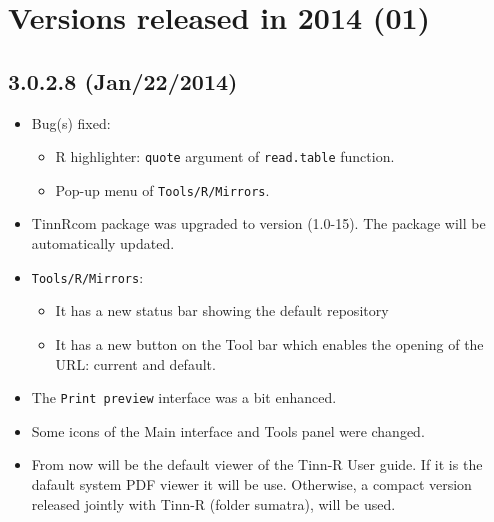 
\section{Versions released in 2014 (01)}
\subsection{3.0.2.8 (Jan/22/2014)}
\begin{itemize}
  \item Bug(s) fixed:
    \begin{itemize}
      \item R highlighter: \texttt{quote} argument of \texttt{read.table} function.
      \item Pop-up menu of \texttt{Tools/R/Mirrors}.
    \end{itemize}
  \item TinnRcom package was upgraded to version (1.0-15).
   The package will be automatically updated.
  \item \texttt{Tools/R/Mirrors}:
    \begin{itemize}
       \item It has a new status bar showing the default repository
       \item It has a new button on the Tool bar which enables the opening of the
             URL: current and default.
    \end{itemize}
  \item The \texttt{Print preview} interface was a bit enhanced.
  \item Some icons of the Main interface and Tools panel were changed.
  \item From now 
   will be the default viewer of the Tinn-R User guide.
   If it is the dafault system PDF viewer it will be use. Otherwise, a compact version
   released jointly with Tinn-R (folder sumatra), will be used.
\end{itemize}